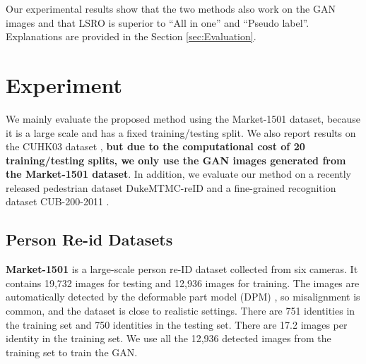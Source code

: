 \documentclass[10pt,twocolumn,letterpaper]{article}
\begin{document}
Our experimental results show that the two methods also work on the GAN images and that LSRO is superior to ``All in one'' and ``Pseudo label''. Explanations are provided in the Section \ref{sec:Evaluation}.




\section{Experiment} \label{sec:experiment}
We mainly evaluate the proposed method using the Market-1501 \cite{zheng2015scalable} dataset, because it is a large scale and has a fixed training/testing split. We also report results on the CUHK03 dataset \cite{li2014deepreid}, \textbf{but due to the computational cost of 20 training/testing splits, we only use the GAN images generated from the Market-1501 dataset}. In addition, we evaluate our method on a recently released pedestrian dataset DukeMTMC-reID \cite{ristani2016MTMC} and a fine-grained recognition dataset CUB-200-2011 \cite{WahCUB_200_2011}. 

\subsection{Person Re-id Datasets}
\textbf{Market-1501} is a large-scale person re-ID dataset collected from six cameras. It contains 19,732 images for testing and 12,936 images for training. The images are automatically detected by the deformable part model (DPM) \cite{felzenszwalb2010object}, so misalignment is common, and the dataset is close to realistic settings. There are 751 identities in the training set and 750 identities in the testing set. There are 17.2 images per identity in the training set. We use all the 12,936 detected images from the training set to train the GAN. 
\end{document}
